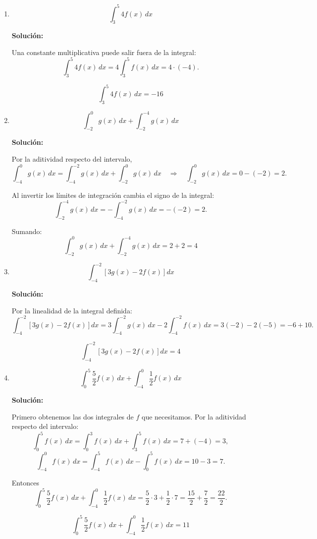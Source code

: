 \documentclass[12pt]{article}
\newcommand{\solucion}{%
    \vspace{0.8em}%
    \textbf{Solución:}%
}
\begin{document}
\begin{enumerate}[label=\alph*.-]

    \item
    \[
    \int_{3}^{5}4f(x)\,dx
    \]

    \solucion

    Una constante multiplicativa puede salir fuera de la integral:
    \[
    \int_{3}^{5}4f(x)\,dx=4\int_{3}^{5}f(x)\,dx=4\cdot(-4).
    \]

    \[
    \boxed{
    \int_{3}^{5}4f(x)\,dx=-16
    }
    \]


    \item
    \[
    \int_{-2}^{0}g(x)\,dx+\int_{-2}^{-4}g(x)\,dx
    \]

    \solucion

    Por la aditividad respecto del intervalo,
    \[
    \int_{-4}^{0}g(x)\,dx=\int_{-4}^{-2}g(x)\,dx+\int_{-2}^{0}g(x)\,dx
    \quad\Rightarrow\quad
    \int_{-2}^{0}g(x)\,dx=0-(-2)=2.
    \]

    Al invertir los límites de integración cambia el signo de la integral:
    \[
    \int_{-2}^{-4}g(x)\,dx=-\int_{-4}^{-2}g(x)\,dx=-(-2)=2.
    \]

    Sumando:
    \[
    \boxed{
    \int_{-2}^{0}g(x)\,dx+\int_{-2}^{-4}g(x)\,dx=2+2=4
    }
    \]


    \item
    \[
    \int_{-4}^{-2}\left[3g(x)-2f(x)\right]dx
    \]

    \solucion

    Por la linealidad de la integral definida:
    \[
    \int_{-4}^{-2}\left[3g(x)-2f(x)\right]dx
    =3\int_{-4}^{-2}g(x)\,dx-2\int_{-4}^{-2}f(x)\,dx
    =3(-2)-2(-5)=-6+10.
    \]

    \[
    \boxed{
    \int_{-4}^{-2}\left[3g(x)-2f(x)\right]dx=4
    }
    \]


    \item
    \[
    \int_{0}^{5}\frac52f(x)\,dx+\int_{-4}^{0}\frac12f(x)\,dx
    \]

    \solucion

    Primero obtenemos las dos integrales de $f$ que necesitamos. Por la
    aditividad respecto del intervalo:
    \[
    \int_{0}^{5}f(x)\,dx=\int_{0}^{3}f(x)\,dx+\int_{3}^{5}f(x)\,dx=7+(-4)=3,
    \]
    \[
    \int_{-4}^{0}f(x)\,dx=\int_{-4}^{5}f(x)\,dx-\int_{0}^{5}f(x)\,dx=10-3=7.
    \]

    Entonces
    \[
    \int_{0}^{5}\frac52f(x)\,dx+\int_{-4}^{0}\frac12f(x)\,dx
    =\frac52\cdot3+\frac12\cdot7=\frac{15}{2}+\frac72=\frac{22}{2}.
    \]

    \[
    \boxed{
    \int_{0}^{5}\frac52f(x)\,dx+\int_{-4}^{0}\frac12f(x)\,dx=11
    }
    \]

\end{enumerate}
\end{document}
